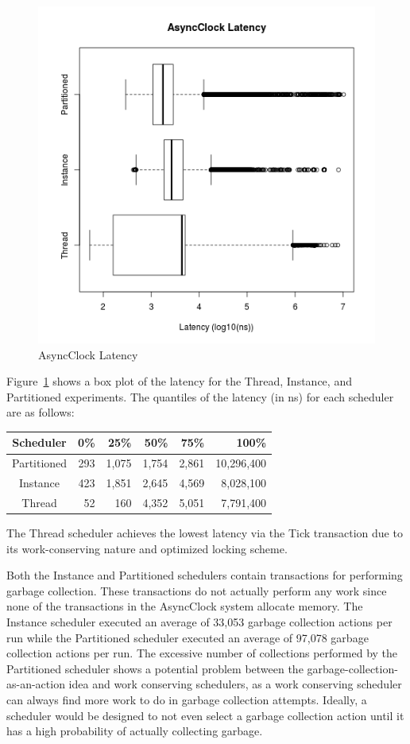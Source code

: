 \begin{figure}[H]
\center
\includegraphics[height=.4\textheight]{async_latency_box.png}
\caption{AsyncClock Latency}
\label{async_latency_box}
\end{figure}

Figure~\ref{async_latency_box} shows a box plot of the latency for the Thread, Instance, and Partitioned experiments.
The quantiles of the latency (in ns) for each scheduler are as follows:
\begin{center}
\begin{tabular}{crrrrr}
Scheduler &       0\%  &    25\%  &    50\%  &    75\%  &   100\% \\
\hline
Partitioned & 293 & 1,075 & 1,754 & 2,861 & 10,296,400 \\
Instance    & 423 & 1,851 & 2,645 & 4,569 &  8,028,100 \\
Thread      &  52 &   160 & 4,352 & 5,051 &  7,791,400 \\
\end{tabular}
\end{center}
The Thread scheduler achieves the lowest latency via the Tick transaction due to its work-conserving nature and optimized locking scheme.

Both the Instance and Partitioned schedulers contain transactions for performing garbage collection.
These transactions do not actually perform any work since none of the transactions in the AsyncClock system allocate memory.
The Instance scheduler executed an average of 33,053 garbage collection actions per run while the Partitioned scheduler executed an average of 97,078 garbage collection actions per run.
The excessive number of collections performed by the Partitioned scheduler shows a potential problem between the garbage-collection-as-an-action idea and work conserving schedulers, as a work conserving scheduler can always find more work to do in garbage collection attempts.
Ideally, a scheduler would be designed to not even select a garbage collection action until it has a high probability of actually collecting garbage.

